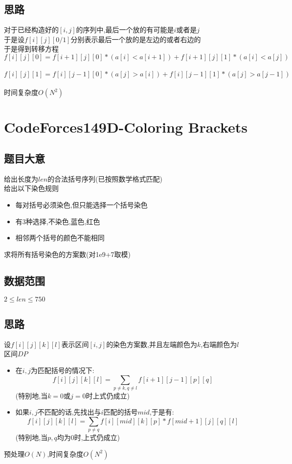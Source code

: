 \documentclass{ctexart}
\numberwithin{equation}{section}
\begin{document}
\begin{flushleft}
  \subsection{思路}
  对于已经构造好的$[i,j]$的序列中,最后一个放的有可能是$i$或者是$j$ \\
  于是设$f[i][j][0/1]$分别表示最后一个放的是左边的或者右边的 \\
  于是得到转移方程 $$f[i][j][0]=f[i+1][j][0]*(a[i]<a[i+1]) + f[i+1][j][1]*(a[i] < a[j])$$ \\
  $$f[i][j][1]=f[i][j-1][0]*(a[j]>a[i]) + f[i][j-1][1]*(a[j]>a[j-1])$$ \\
  时间复杂度$O(N^2)$ \\
  \newpage

  \section{CodeForces149D-Coloring Brackets}
  \subsection{题目大意}
  给出长度为$len$的合法括号序列(已按照数学格式匹配) \\
  给出以下染色规则 \\
  \begin{itemize}
  \item 每对括号必须染色,但只能选择一个括号染色 \\
  \item 有$3$种选择,不染色,蓝色,红色\\
  \item 相邻两个括号的颜色不能相同\\
  \end{itemize}
  求将所有括号染色的方案数(对1e9+7取模)
  \subsection{数据范围}
  $2\le len \le 750$ \\
  \subsection{思路}
  设$f[i][j][k][l]$表示区间$[i,j]$的染色方案数,并且左端颜色为$k$,右端颜色为$l$ \\
  区间$DP$ \\
  \begin{itemize}
  \item 在$i,j$为匹配括号的情况下:$$f[i][j][k][l]=\sum_{p\not=k,q \not=l}f[i+1][j-1][p][q]$$(特别地,当$k=0$或$j=0$时上式仍成立) \\
  \item 如果$i,j$不匹配的话,先找出与$i$匹配的括号$mid$,于是有:$$f[i][j][k][l]=\sum_{p\not=q}f[i][mid][k][p]*f[mid+1][j][q][l]$$(特别地,当$p,q$均为0时,上式仍成立) \\
  \end{itemize}
  预处理$O(N)$,时间复杂度$O(N^2)$ \\
  \newpage


\end{flushleft}
\end{document}
